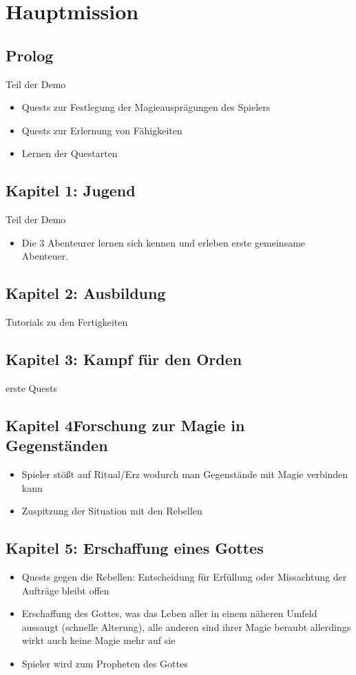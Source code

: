 \chapter{Hauptmission}
\section{Prolog}
Teil der Demo
\begin{itemize}
	\item Quests zur Festlegung der Magieausprägungen des Spielers
	\item Quests zur Erlernung von Fähigkeiten
	\item Lernen der Questarten
\end{itemize}
\section{Kapitel 1: Jugend}
Teil der Demo
\begin{itemize}
	\item Die 3 Abenteurer lernen sich kennen und erleben erste gemeinsame Abenteuer.
\end{itemize}
\section{Kapitel 2: Ausbildung}
Tutorials zu den Fertigkeiten
\section{Kapitel 3: Kampf für den Orden}
erste Quests
\section{Kapitel 4Forschung zur Magie in Gegenständen}
\begin{itemize}
	\item Spieler stößt auf Ritual/Erz wodurch man Gegenstände mit Magie verbinden kann
	\item Zuspitzung der Situation mit den Rebellen
\end{itemize}
\section{Kapitel 5: Erschaffung eines Gottes}
\begin{itemize}
	\item Quests gegen die Rebellen: Entscheidung für Erfüllung oder Missachtung der Aufträge bleibt offen
	\item Erschaffung des Gottes, was das Leben aller in einem näheren Umfeld aussaugt (schnelle Alterung), alle anderen sind ihrer Magie beraubt allerdings wirkt auch keine Magie mehr auf sie
	\item Spieler wird zum Propheten des Gottes
\end{itemize}